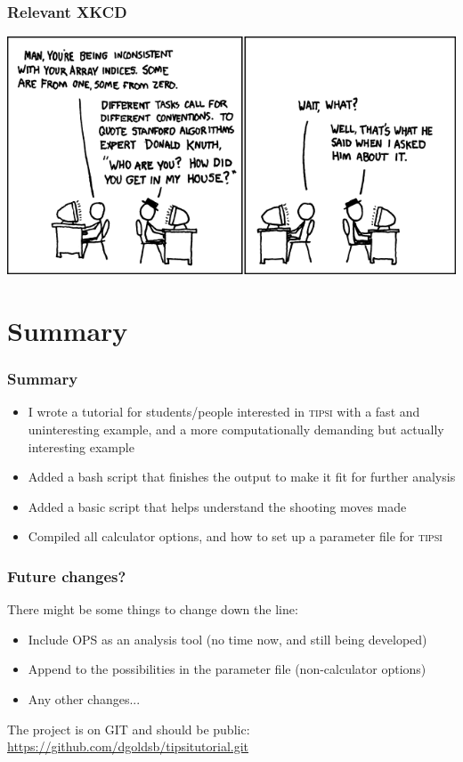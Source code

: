 \documentclass[hyperref={pdfpagelabels=false}]{beamer}
\begin{document}
\begin{frame}
\frametitle{Relevant XKCD}
\begin{center}
\includegraphics[scale=4]{images/donald_knuth.png}
\end{center}
\end{frame}

\section{Summary}
\setcounter{subsection}{1}

\begin{frame}
\frametitle{Summary} 
\begin{itemize}
\item I wrote a tutorial for students/people interested in \textsc{tipsi} with a fast and uninteresting example, and a more computationally demanding but actually interesting example
\item Added a bash script that finishes the output to make it fit for further analysis
\item Added a basic script that helps understand the shooting moves made
\item Compiled all calculator options, and how to set up a parameter file for \textsc{tipsi}
\end{itemize}
\end{frame}

\begin{frame}
\frametitle{Future changes?}
There might be some things to change down the line:
\begin{itemize}
\item Include OPS as an analysis tool (no time now, and still being developed)
\item Append to the possibilities in the parameter file (non-calculator options)
\item Any other changes...
\end{itemize} 
The project is on GIT and should be public: \url{https://github.com/dgoldsb/tipsitutorial.git}
\end{frame}
\end{document}
